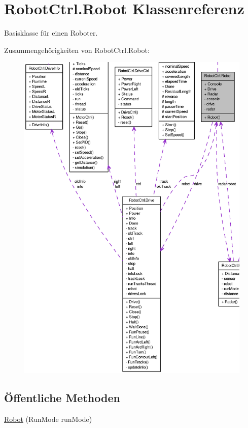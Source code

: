 \hypertarget{class_robot_ctrl_1_1_robot}{
\section{RobotCtrl.Robot Klassenreferenz}
\label{class_robot_ctrl_1_1_robot}
}


Basisklasse f\"{u}r einen Roboter.  




Zusammengehörigkeiten von RobotCtrl.Robot:\nopagebreak
\begin{figure}[H]
\begin{center}
\leavevmode
\includegraphics[width=400pt]{class_robot_ctrl_1_1_robot__coll__graph}
\end{center}
\end{figure}
\subsection*{Öffentliche Methoden}
\begin{DoxyCompactItemize}
\item 
\hyperlink{class_robot_ctrl_1_1_robot_acdd921df41328916b058eaad84ed3078}{Robot} (RunMode runMode)
\end{DoxyCompactItemize}
